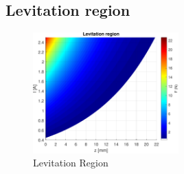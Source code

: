\subsection{Levitation region}
\label{subsec:levitation_region}

\begin{figure}[H]
    \centering
    \includegraphics[width=0.5\textwidth]{./img/MATLAB/analysis/levitation_region.pdf}
    \caption{Levitation Region}
    \label{fig:levitation_region}
\end{figure}